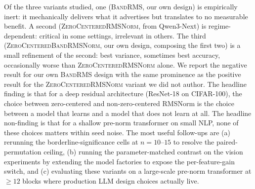 \documentclass{article}
\newcommand{\bandrms}{\textsc{BandRMS}}
\newcommand{\zcrms}{\textsc{ZeroCentered}\-\textsc{RMSNorm}}
\newcommand{\zcband}{\textsc{ZeroCentered}\-\textsc{BandRMSNorm}}
\begin{document}
Of the three variants studied, one (\bandrms{}, our own design) is empirically inert: it mechanically delivers what it advertises but translates to no measurable benefit.
A second (\zcrms{}, from Qwen3-Next) is regime-dependent: critical in some settings, irrelevant in others.
The third (\zcband{}, our own design, composing the first two) is a small refinement of the second: best variance, sometimes best accuracy, occasionally worse than \zcrms{} alone.
We report the negative result for our own \bandrms{} design with the same prominence as the positive result for the \zcrms{} variant we did not author.
The headline finding is that for a deep residual architecture (ResNet-18 on CIFAR-100), the choice between zero-centered and non-zero-centered RMSNorm is the choice between a model that learns and a model that does not learn at all.
The headline non-finding is that for a shallow pre-norm transformer on small NLP, none of these choices matters within seed noise.
The most useful follow-ups are (a) rerunning the borderline-significance cells at $n{=}10$--$15$ to resolve the paired-permutation ceiling, (b) running the parameter-matched contrast on the vision experiments by extending the model factories to expose the per-feature-gain switch, and (c) evaluating these variants on a large-scale pre-norm transformer at $\geq 12$ blocks where production LLM design choices actually live.


\end{document}
